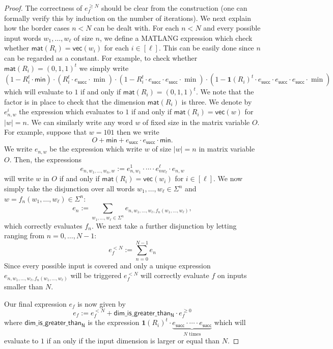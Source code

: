 \begin{proof}
The correctness of $e_f^{\geq N}$ should be clear from the construction (one can formally verify this by
induction on the number of iterations). We next explain how the border cases $n<N$ can be dealt with.
For each $n<N$ and every possible input words
$w_1,\ldots,w_\ell$ of size $n$, we define a MATLANG expression which check whether
$\mathsf{mat}(R_i)=\mathsf{vec}(w_i)$ for each $i\in[\ell]$. This can be easily done since $n$ can be regarded as a constant. For example, to check whether $\mathsf{mat}(R_i)=(0,1,1)^t$ we simply write
$$
(1- R_i^t\cdot \mathsf{min})\cdot (R_i^t\cdot e_{\mathsf{succ}}\cdot\min)\cdot (1- R_i^t\cdot e_{\mathsf{succ}}\cdot e_{\mathsf{succ}}\cdot \min)\cdot (1- \mathbf{1}(R_i)^t\cdot e_{\mathsf{succ}}\cdot e_{\mathsf{succ}}\cdot e_{\mathsf{succ}}\cdot \min)
$$
which will evaluate to $1$ if and only if $\mathsf{mat}(R_i)=(0,1,1)^t$. We note that the factor is in place to check that the dimension $\mathsf{mat}(R_i)$ is three.
  We denote by
$e_{n,w}^i$ the expression which evaluates to $1$ if and only if $\mathsf{mat}(R_i)=\mathsf{vec}(w)$
for $|w|=n$.
We can similarly
write any word $w$ of fixed size in the matrix variable $O$. For example, suppose that $w=101$
then we write 
$$
O+ \mathsf{min}+  e_{\mathsf{succ}}\cdot e_{\mathsf{succ}}\cdot\mathsf{min}.
$$
We write $e_{n,w}$ be the expression which write $w$ of size $|w|=n$ in matrix variable $O$.
Then, the expressions
$$
e_{n,w_1,\ldots,w_n,w}:=e_{n,w_1}^1\cdot\cdots\cdot e_{nw_{\ell}}^\ell\cdot e_{n,w}
$$
will write $w$ in $O$ if and only if $\mathsf{mat}(R_i)=\mathsf{vec}(w_i)$ for $i\in[\ell]$.
We now simply take the disjunction over all words $w_1,\ldots,w_\ell\in\Sigma^n$ and $w=f_n(w_1,\ldots,w_\ell)\in\Sigma^n$:
$$
e_n:=\sum_{w_1,\ldots,w_\ell\in\Sigma^n} e_{n,w_1,\ldots,w_\ell,f_n(w_1,\ldots,w_\ell)},
$$
which correctly evaluates $f_n$. We next take a further disjunction by letting ranging from 
$n=0,\ldots, N-1$:
$$
e_f^{<N}:=\sum_{n=0}^{N-1} e_n
$$
Since every possible input is covered and only a unique expression $ e_{n,w_1,\ldots,w_\ell,f_n(w_1,\ldots,w_\ell)}$ will be triggered $e_f^{<N}$ will correctly
evaluate $f$ on inputs smaller than $N$.

Our final expression $e_f$ is now given by
$$
e_f:=e_f^{<N} + \mathsf{dim\_is\_greater\_than_N}\cdot e_f^{\geq 0}
$$
where $\mathsf{dim\_is\_greater\_than_N}$ is the expression
$\mathbf{1}(R_i)^t\cdot\underbrace{e_{\mathsf{succ}}\cdot\cdots\cdot e_{\mathsf{succ}}}_{\text{$N$ times}}$ which will evaluate to $1$ if an only if the input dimension is larger or equal than $N$.
\end{proof}

